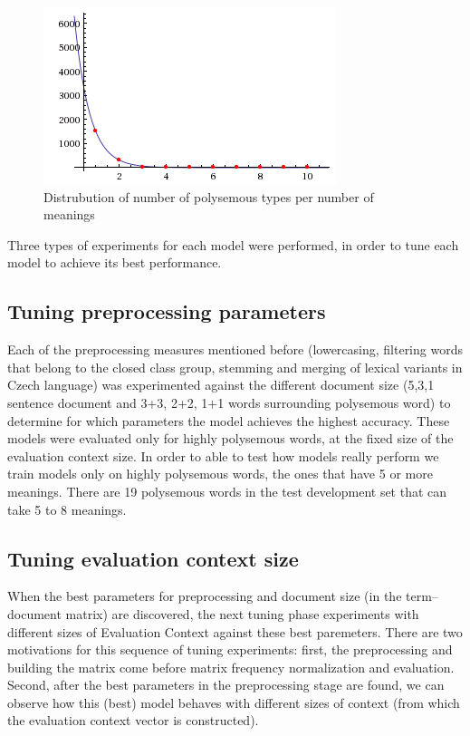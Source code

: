 \begin{figure}[h!]
\includegraphics{img/meaningTypePlot.png}
\caption{Distrubution of number of polysemous types per number of meanings}
\end{figure}


Three types of experiments for each model were performed, in order to tune each model to achieve its 
best performance.
\subsection{Tuning preprocessing parameters}
Each of the preprocessing measures mentioned before 
(lowercasing, filtering words that belong to the closed class group, stemming and merging of lexical
variants in Czech language) was experimented against the different document size (5,3,1 sentence 
document and 3+3, 2+2, 1+1 words surrounding polysemous word) to determine for which parameters the model achieves the highest accuracy. These models were evaluated only for highly polysemous
words, at the fixed size of the evaluation context size. In  order to able to test how models really perform 
we train models only on highly polysemous words, the ones that have 5 or more meanings.  There are 19 
polysemous words in the test development set that can take 5 to 8 meanings.

\subsection{Tuning evaluation context size} 
When the best parameters for preprocessing and document size (in the term--document matrix) are 
discovered, the next tuning phase experiments with different sizes of Evaluation Context against these best 
paremeters. There are two motivations for this sequence of tuning experiments: first, the preprocessing
 and building the matrix come before matrix frequency normalization and evaluation. Second, after
the best parameters in the preprocessing stage are found, we can observe how this (best) model behaves 
with different sizes of context (from which the evaluation context vector is constructed). 

